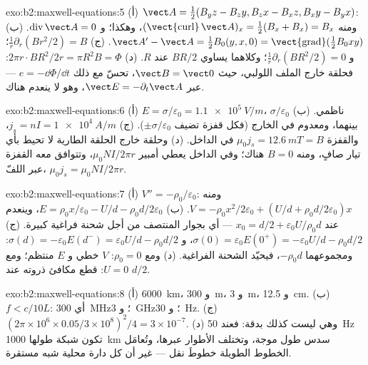 \begin{solution}{exo:b2:maxwell-equations:5}
(أ) $\vect A = \tfrac12(B_yz - B_zy, B_zx - B_xz, B_xy - B_yx)$: ومنه $(\operatorname{\vect{curl}}
\vect A)_x = \tfrac12(B_x + B_x) = B_x$، وهكذا؛ و $\operatorname{div}\vect A = 0$. (ب)
$\vect A' - \vect A = \tfrac12B_0(y, x, 0) = \operatorname{\vect{grad}}(\tfrac12B_0xy)$. (ج)
$\frac1r\partial_r(Br^2/2) = B$؛ و $\frac1r\partial_r(BR^2/2) = 0$؛ وكلاهما يساوي $BR/2$ عند
$R$. (د) $2\pi r\cdot BR^2/2r = \pi R^2B = \Phi$: فحلقة خارج الملف اللولبي،
حيث $\vect B = \vect 0$، تحسّ مع ذلك $e = -\dd\Phi/\dd t$ --- عبر $\vect E =
-\partial_t\vect A$، وهو لا ينعدم هناك.
\end{solution}

\begin{solution}{exo:b2:maxwell-equations:6}
(أ) $E = \sigma/\varepsilon_0 = \qty{1.1e5}{V/m}$، ناظمي. (ب) $\sigma/\varepsilon_0$ بينهما، ومعدوم
في الخارج (فكل قفزة تضيف $\pm\sigma/\varepsilon_0$). (ج) $j_s = nI = \qty{1e4}{A/m}$، والقفزة
$\mu_0j_s = \qty{12.6}{mT} = B$ في الداخل. (د) وحلقة خارج الحلقة الطارية لا تحيط
بأي تيار صافٍ، ومنه $B = 0$ هناك؛ وفي الداخل يعطي أمبير $\mu_0NI/2\pi r$،
وتتوافق معه القفزة عبر اللفّ، $\mu_0j_s = \mu_0NI/2\pi r$.
\end{solution}

\begin{solution}{exo:b2:maxwell-equations:7}
(أ) $V'' = -\rho_0/\varepsilon_0$: ومنه $V = -\rho_0x^2/2\varepsilon_0 + (U/d + \rho_0d/2\varepsilon_0)x$. (ب)
$E = \rho_0x/\varepsilon_0 - U/d - \rho_0d/2\varepsilon_0$، وينعدم عند $x_0 = d/2 + \varepsilon_0U/\rho_0d$
--- أي بجوار المنتصف من أجل شحنة فراغية كبيرة. (ج) $\sigma(0) = \varepsilon_0E(0^+) =
-\varepsilon_0U/d - \rho_0d/2$، و $\sigma(d) = -\varepsilon_0E(d^-) = \varepsilon_0U/d - \rho_0d/2$: ومجموعهما
$-\rho_0d$، فيحيّد الشحنة الفراغية. (د) ومع $\rho_0 = 0$: $V$ خطي و
$E$ منتظم؛ ومع $U = 0$: قطع مكافئ ذروته عند $d/2$.
\end{solution}

\begin{solution}{exo:b2:maxwell-equations:8}
(أ) \qty{6000}{km}، و \qty{300}{m}، و \qty{3}{m}، و \qty{12.5}{cm}. (ب) $f < c/10L$:
أي \qty{300}{MHz}؛ و \qty{3}{GHz}؛ و \qty{30}{Hz}. (ج) $(2\pi \times 10^6 \times 0.05/3 \times 10^8)^2/4 =
3 \times 10^{-7}$. (د) وهي ليست كذلك بدقة: فعند \qty{50}{Hz} تكون شبكة طولها \qty{1000}{km}
سدس طول موجة، وتختلف الأطوار عبرها، وتُعامَل الخطوط الطويلة
خطوطَ نقل --- غير أن كل دارة محلية
شبه مستقرة.
\end{solution}

